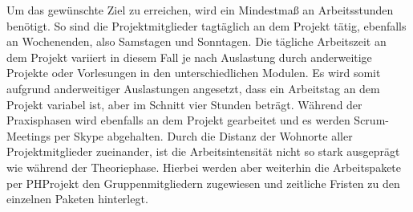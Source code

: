 Um das gewünschte Ziel zu erreichen, wird ein Mindestmaß an Arbeitsstunden benötigt. So sind die Projektmitglieder 
tagtäglich an dem Projekt tätig, ebenfalls an Wochenenden, also Samstagen und Sonntagen. Die tägliche Arbeitszeit an dem 
Projekt variiert in diesem Fall je nach Auslastung durch anderweitige Projekte oder Vorlesungen in den unterschiedlichen 
Modulen. Es wird somit aufgrund anderweitiger Auslastungen angesetzt, dass ein Arbeitstag an dem Projekt variabel ist, 
aber im Schnitt vier Stunden beträgt. Während der Praxisphasen wird ebenfalls an dem Projekt gearbeitet und es werden Scrum-Meetings per Skype abgehalten. Durch die Distanz der Wohnorte aller Projektmitglieder zueinander, ist die 
Arbeitsintensität nicht so stark ausgeprägt wie während der Theoriephase. Hierbei werden aber weiterhin die Arbeitspakete 
per PHProjekt den Gruppenmitgliedern zugewiesen und zeitliche Fristen zu den einzelnen Paketen hinterlegt.